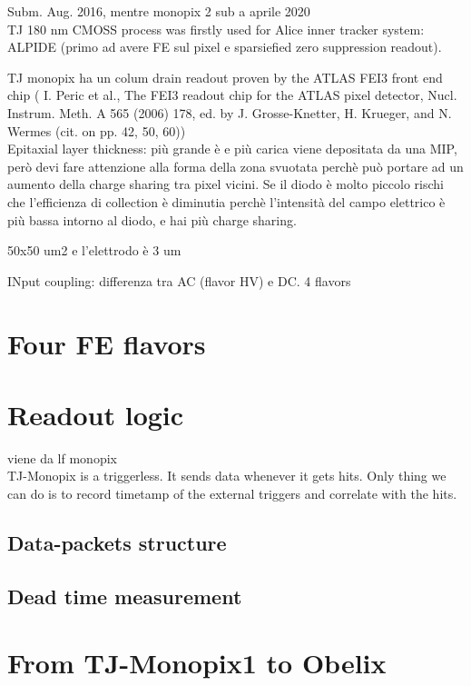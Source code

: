 
Subm. Aug. 2016, mentre monopix 2 sub a aprile 2020\\
TJ 180 nm CMOSS process was firstly used for Alice inner tracker system: ALPIDE
(primo ad avere FE sul pixel e sparsiefied zero suppression readout).

TJ monopix ha un colum drain readout proven by the ATLAS FEI3 front end chip (
I. Peric et al., The FEI3 readout chip for the ATLAS pixel detector,
Nucl. Instrum. Meth. A 565 (2006) 178, ed. by J. Grosse-Knetter, H. Krueger, and N. Wermes
(cit. on pp. 42, 50, 60))\\

Epitaxial layer thickness: più grande è e più carica viene depositata da una MIP,
però devi fare attenzione alla forma della zona svuotata perchè può portare ad un
aumento della charge sharing tra pixel vicini.
Se il diodo è molto piccolo rischi che l'efficienza di collection è diminutia perchè
l'intensità del campo elettrico è più bassa intorno al diodo, e hai più charge sharing.

50x50 um2 e l'elettrodo è 3 um

INput coupling: differenza tra AC (flavor HV) e DC. 4 flavors\\



\section{Four FE flavors}

\begin{comment}
    R resistenza di reset deve essere abbastanza grande in modo da far si che il
ritorno allo zero è abbastanza lento (non devi "interferire" con la tot slope
e non devi più corto del tempo del preamplificatore, sennò hai perdita di segnale).\\
Baseline reset: all'input solitamente hai un PMOSS o un diodo;  
Voltage amplifier: perchè? ripeti un attimo il vantaggio. \\
Source follower per disaccoppiare shaper e LF feedback.\\
\end{comment}


\section{Readout logic}
viene da lf monopix\\
TJ-Monopix is a triggerless. It sends data whenever it gets hits. Only thing we can do is to record timetamp of the external triggers and correlate with the hits. 

\subsection{Data-packets structure}

\subsection{Dead time measurement}

\section{From TJ-Monopix1 to Obelix}
